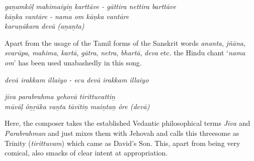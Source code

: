 \begin{myquote}
\textit{gaṉamkôḷ mahimaiyiṉ karttāve - gāttira nettira barttāve \\ kāṇka vantāre - nama om kāṇka vantāre\\ karuṇākara devā (aṉaṉta) }
\end{myquote}

\begin{myquote}
\end{myquote}

\begin{myquote}
\end{myquote}

Apart from the usage of the Tamil forms of the Sanskrit words \textit{ananta}, \textit{jñāna}, \textit{svarūpa}, \textit{mahima}, \textit{kartā}, \textit{gātra}, \textit{netra}, \textit{bhartā}, \textit{deva} etc. the Hindu chant ‘\textit{nama om}’ has been used unabashedly in this song.

\begin{myquote}
\textit{devā irakkam illaiyo - ecu devā irakkam illaiyo}
\end{myquote}

\begin{myquote}
\textit{jīva parabrahma yehovā tirittuvattiṉ \\ mūvāḷ ôṉṟāka vaṉta tāvītiṉ maiṉtaṉ ôre (devā)}
\end{myquote}

\begin{myquote}
\end{myquote}

\begin{myquote}
\end{myquote}

Here, the composer takes the established Vedantic philosophical terms \textit{Jīva} and \textit{Parabrahman} and just mixes them with Jehovah and calls this threesome as Trinity (\textit{tirittuvam}) which came as David’s Son. This, apart from being very comical, also smacks of clear intent at appropriation.

